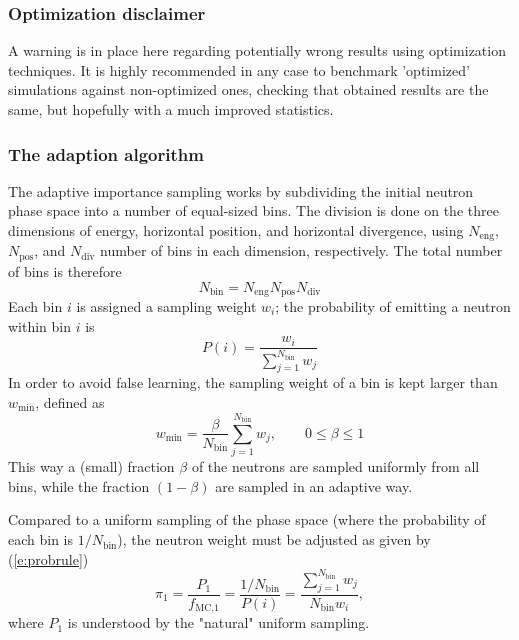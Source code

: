 \subsubsection{Optimization disclaimer}

A warning is in place here regarding potentially wrong results
using optimization techniques.
It is highly recommended in any case to benchmark 'optimized' simulations
against non-optimized ones, checking that obtained results are the same,
but hopefully with a much improved statistics.

\subsubsection{The adaption algorithm}

The adaptive importance sampling works by subdividing the initial
neutron phase space into a number of equal-sized bins. The division is
done on the three dimensions of energy, horizontal position, and
horizontal divergence, using $N_\textrm{eng}$, $N_\textrm{pos}$, and $N_\textrm{
  div}$ number of bins in each dimension, respectively. The total number
of bins is therefore
\begin{equation}
N_\textrm{bin} = N_\textrm{eng} N_\textrm{pos} N_\textrm{div}
\end{equation}
Each bin $i$ is assigned a sampling weight $w_i$; the probability of
emitting a neutron within bin $i$ is
\begin{equation}
P(i) = \frac{w_i}{\sum_{j=1}^{N_\textrm{bin}} w_j}
\end{equation}
In order to avoid false learning, the sampling weight of a bin is
kept larger than $w_\textrm{min}$, defined as
\begin{equation}
w_\textrm{min} = \frac{\beta}{N_\textrm{bin}}\sum_{j=1}^{N_\textrm{bin}}w_j,\qquad
    0 \leq \beta \leq 1
\end{equation}
This way a (small) fraction $\beta$ of the neutrons are sampled
uniformly from all bins, while the fraction $(1 - \beta)$ are sampled in an adaptive way.

Compared to a uniform sampling of the phase space (where the probability
of each bin is $1/N_\textrm{bin}$), the neutron weight
must be adjusted as given by (\ref{e:probrule})
\begin{equation}
\pi_1 = \frac{P_1}{f_\textrm{MC,1}} =\frac{1/N_\textrm{bin}}{P(i)} =
    \frac{\sum_{j=1}^{N_\textrm{bin}} w_j}{N_\textrm{bin} w_i} ,
\end{equation}
where $P_1$ is understood by the "natural" uniform sampling.

